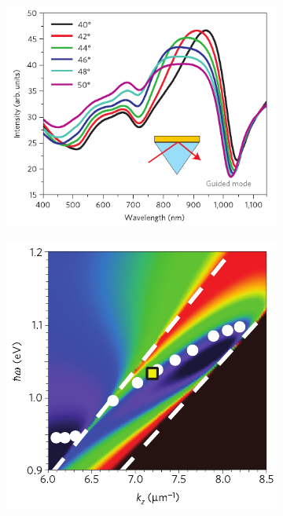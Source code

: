 	\begin{figure}[h!]\centering
		\begin{subfigure}{.01\linewidth}\caption{ }\label{sfig:DipATR} \vspace{3.5cm}	\end{subfigure}  
		\begin{subfigure}{.29\linewidth}\includegraphics[scale=.68]{0-4-Introduccion/figs/0-ATRKobashin2009}\end{subfigure}	\hspace{1em}
		\begin{subfigure}{.01\linewidth}\caption{ }\label{sfig:k(w)Kobashin} \vspace{3.5cm}	\end{subfigure} 
		\begin{subfigure}{.28\linewidth}\includegraphics[scale=.81]{0-4-Introduccion/figs/0-k(w)Kobashin2009}\end{subfigure}		

\end{figure}

